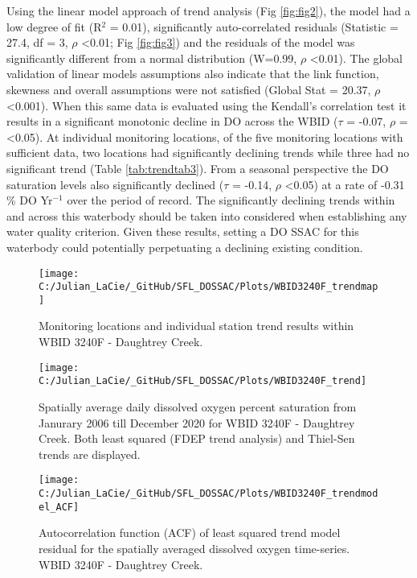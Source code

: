 \documentclass[]{interact}
\theoremstyle{plain}%
\theoremstyle{definition}
\theoremstyle{remark}
\begin{document}
Using the linear model approach of trend analysis (Fig \ref{fig:fig2}),
the model had a low degree of fit (R\(^{2}\) = 0.01), significantly
auto-correlated residuals (Statistic = 27.4, df = 3, \(\rho\)
\textless0.01; Fig \ref{fig:fig3}) and the residuals of the model was
significantly different from a normal distribution (W=0.99, \(\rho\)
\textless0.01). The global validation of linear models assumptions also
indicate that the link function, skewness and overall assumptions were
not satisfied (Global Stat = 20.37, \(\rho\) \textless0.001). When this
same data is evaluated using the Kendall's correlation test it results
in a significant monotonic decline in DO across the WBID (\(\tau\) =
-0.07, \(\rho\) = \textless0.05). At individual monitoring locations, of
the five monitoring locations with sufficient data, two locations had
significantly declining trends while three had no significant trend
(Table \ref{tab:trendtab3}). From a seasonal perspective the DO
saturation levels also significantly declined (\(\tau\) = -0.14,
\(\rho\) \textless0.05) at a rate of -0.31 \% DO Yr\(^{-1}\) over the
period of record. The significantly declining trends within and across
this waterbody should be taken into considered when establishing any
water quality criterion. Given these results, setting a DO SSAC for this
waterbody could potentially perpetuating a declining existing condition.

\begin{figure}[H]
\texttt{[image: C:/Julian\_LaCie/\_GitHub/SFL\_DOSSAC/Plots/WBID3240F\_trendmap]} \caption{\label{fig:mapfig1} Monitoring locations and individual station trend results within WBID 3240F - Daughtrey Creek.}\label{fig:unnamed-chunk-3}
\end{figure}

\begin{figure}[H]
\texttt{[image: C:/Julian\_LaCie/\_GitHub/SFL\_DOSSAC/Plots/WBID3240F\_trend]} \caption{\label{fig:fig2} Spatially average daily dissolved oxygen percent saturation from Janurary 2006 till December 2020 for  WBID 3240F - Daughtrey Creek. Both least squared (FDEP trend analysis) and Thiel-Sen trends are displayed.}\label{fig:unnamed-chunk-4}
\end{figure}

\begin{figure}[H]

{\centering \texttt{[image: C:/Julian\_LaCie/\_GitHub/SFL\_DOSSAC/Plots/WBID3240F\_trendmodel\_ACF]} 

}

\caption{\label{fig:fig3} Autocorrelation function (ACF) of least squared trend model residual for the spatially averaged dissolved oxygen time-series. WBID 3240F - Daughtrey Creek.}\label{fig:unnamed-chunk-5}
\end{figure}
\end{document}
